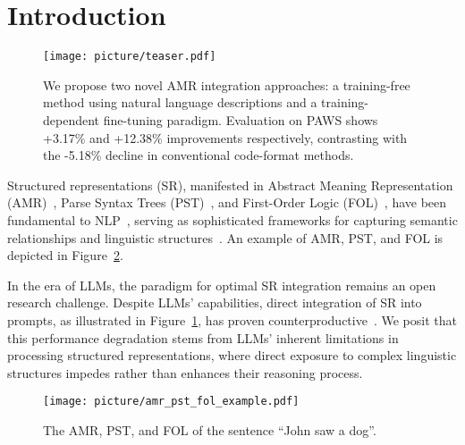 \section{Introduction}
\begin{figure}[!ht]
\centering
\texttt{[image: picture/teaser.pdf]}
\vspace{-0.6cm}
\caption{We propose two novel AMR integration approaches: a training-free method using natural language descriptions and a training-dependent fine-tuning paradigm. Evaluation on PAWS shows +3.17\% and +12.38\% improvements respectively, contrasting with the -5.18\% decline in conventional code-format methods.}
\vspace{-0.4cm}
\label{fig:teaser}
\end{figure}

Structured representations (SR), manifested in Abstract Meaning Representation (AMR)~\citep{damonte2016incremental, knight2020abstract, ramirez2024natural}, Parse Syntax Trees (PST)~\citep{sachan2020syntax}, and First-Order Logic (FOL)~\citep{barwise1977introduction}, have been fundamental to NLP~\citep{manning1999foundations, collobert2011natural}, serving as sophisticated frameworks for capturing semantic relationships and linguistic structures~\citep{banarescu2013abstract, wang2015transition}. An example of AMR, PST, and FOL is depicted in Figure~\ref{fig:apf}. 

In the era of LLMs, the paradigm for optimal SR integration remains an open research challenge. Despite LLMs' capabilities, direct integration of SR into prompts, as illustrated in Figure~\ref{fig:teaser}, has proven counterproductive~\citep{jin2024analyzing}. We posit that this performance degradation stems from LLMs' inherent limitations in processing structured representations, where direct exposure to complex linguistic structures impedes rather than enhances their reasoning process.

\begin{figure}
\centering
\texttt{[image: picture/amr\_pst\_fol\_example.pdf]}
\caption{The AMR, PST, and FOL of the sentence ``John saw a dog''.}
\label{fig:apf}
\vspace{-0.2in}
\end{figure}


